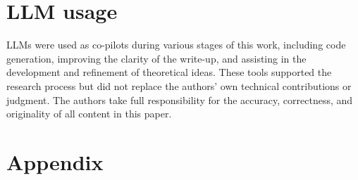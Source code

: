 \documentclass{article}
\theoremstyle{definition}
\theoremstyle{remark}
\begin{document}






\section{LLM usage}   
LLMs were used as co-pilots during various stages of this work, including code generation, improving the clarity of the write-up, and assisting in the development and refinement of theoretical ideas. These tools supported the research process but did not replace the authors' own technical contributions or judgment. The authors take full responsibility for the accuracy, correctness, and originality of all content in this paper.

\appendix
\section{Appendix} 
\end{document}
